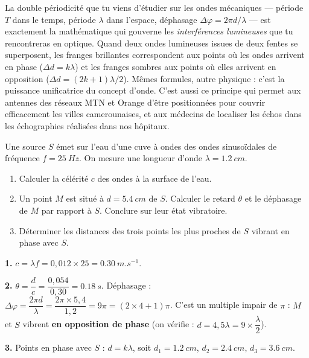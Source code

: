 \documentclass[11pt]{article}
\begin{document}
\begin{savaistu}
La double périodicité que tu viens d'étudier sur les ondes mécaniques — période $T$ dans le temps, période $\lambda$ dans l'espace, déphasage $\Delta\varphi = 2\pi d/\lambda$ — est exactement la mathématique qui gouverne les \emph{interférences lumineuses} que tu rencontreras en optique. Quand deux ondes lumineuses issues de deux fentes se superposent, les franges brillantes correspondent aux points où les ondes arrivent en phase ($\Delta d = k\lambda$) et les franges sombres aux points où elles arrivent en opposition ($\Delta d = (2k+1)\lambda/2$). Mêmes formules, autre physique : c'est la puissance unificatrice du concept d'onde. C'est aussi ce principe qui permet aux antennes des réseaux MTN et Orange d'être positionnées pour couvrir efficacement les villes camerounaises, et aux médecins de localiser les échos dans les échographies réalisées dans nos hôpitaux.
\end{savaistu}

\begin{exercice}
Une source $S$ émet sur l'eau d'une cuve à ondes des ondes sinusoïdales de fréquence $f = \SI{25}{Hz}$. On mesure une longueur d'onde $\lambda = \SI{1,2}{cm}$.
\begin{enumerate}
\item Calculer la célérité $c$ des ondes à la surface de l'eau.
\item Un point $M$ est situé à $d = \SI{5,4}{cm}$ de $S$. Calculer le retard $\theta$ et le déphasage de $M$ par rapport à $S$. Conclure sur leur état vibratoire.
\item Déterminer les distances des trois points les plus proches de $S$ vibrant en phase avec $S$.
\end{enumerate}
\end{exercice}

\begin{corrige}
\textbf{1.} $c = \lambda f = 0{,}012 \times 25 = \SI{0,30}{m.s^{-1}}$.

\textbf{2.} $\theta = \dfrac{d}{c} = \dfrac{0{,}054}{0{,}30} = \SI{0,18}{s}$. Déphasage : $\Delta\varphi = \dfrac{2\pi d}{\lambda} = \dfrac{2\pi \times 5{,}4}{1{,}2} = 9\pi = (2\times 4 + 1)\pi$. C'est un multiple impair de $\pi$ : $M$ et $S$ vibrent \textbf{en opposition de phase} (on vérifie : $d = 4{,}5\lambda = 9 \times \dfrac{\lambda}{2}$).

\textbf{3.} Points en phase avec $S$ : $d = k\lambda$, soit $d_1 = \SI{1,2}{cm}$, $d_2 = \SI{2,4}{cm}$, $d_3 = \SI{3,6}{cm}$.
\end{corrige}
\end{document}
